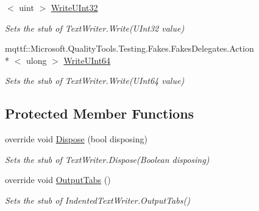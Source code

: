 \begin{DoxyCompactItemize}
$<$ uint $>$ \hyperlink{class_system_1_1_code_dom_1_1_compiler_1_1_fakes_1_1_stub_indented_text_writer_ab596ebfb2de1c41b1caff2ea246f45de}{Write\-U\-Int32}
\begin{DoxyCompactList}\small\item\em Sets the stub of Text\-Writer.\-Write(\-U\-Int32 value)\end{DoxyCompactList}\item 
mqttf\-::\-Microsoft.\-Quality\-Tools.\-Testing.\-Fakes.\-Fakes\-Delegates.\-Action\\*
$<$ ulong $>$ \hyperlink{class_system_1_1_code_dom_1_1_compiler_1_1_fakes_1_1_stub_indented_text_writer_a3972b3bf454aab23d78cd4f5437bcf1e}{Write\-U\-Int64}
\begin{DoxyCompactList}\small\item\em Sets the stub of Text\-Writer.\-Write(\-U\-Int64 value)\end{DoxyCompactList}\end{DoxyCompactItemize}
\subsection*{Protected Member Functions}
\begin{DoxyCompactItemize}
\item 
override void \hyperlink{class_system_1_1_code_dom_1_1_compiler_1_1_fakes_1_1_stub_indented_text_writer_afbd3ab3f5e4fd7030165da5914b4e3d3}{Dispose} (bool disposing)
\begin{DoxyCompactList}\small\item\em Sets the stub of Text\-Writer.\-Dispose(\-Boolean disposing)\end{DoxyCompactList}\item 
override void \hyperlink{class_system_1_1_code_dom_1_1_compiler_1_1_fakes_1_1_stub_indented_text_writer_a828003f733b0d4fe5672f1b5552f624c}{Output\-Tabs} ()
\begin{DoxyCompactList}\small\item\em Sets the stub of Indented\-Text\-Writer.\-Output\-Tabs()\end{DoxyCompactList}\end{DoxyCompactItemize}
